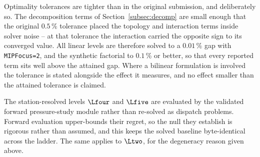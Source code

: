 Optimality tolerances are tighter than in the original submission, and deliberately so.
The decomposition terms of Section~\ref{subsec:decomp} are small enough that the original
$0.5$\,\% tolerance placed the topology and interaction terms inside solver noise -- at
that tolerance the interaction carried the opposite sign to its converged value. All
linear levels are therefore solved to a $0.01$\,\% gap with \texttt{MIPFocus=2}, and the
synthetic factorial to $0.1$\,\% or better, so that every reported term sits well above
the attained gap. Where a bilinear formulation is involved the tolerance is stated
alongside the effect it measures, and no effect smaller than the attained tolerance is
claimed.

The station-resolved levels $\Lfour$ and $\Lfive$ are evaluated by the validated forward
pressure-study module rather than re-solved as dispatch problems. Forward evaluation
upper-bounds their regret, so the null they establish is rigorous rather than assumed, and
this keeps the solved baseline byte-identical across the ladder. The same applies to
$\Ltwo$, for the degeneracy reason given above.
